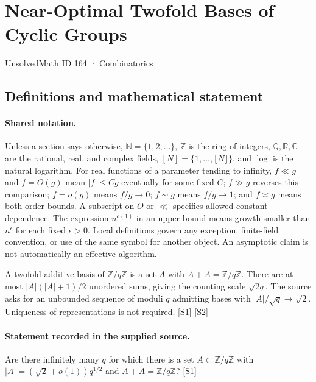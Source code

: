 \documentclass[11pt,a4paper]{article}
\newcommand{\N}{\mathbb{N}}
\newcommand{\Z}{\mathbb{Z}}
\newcommand{\Q}{\mathbb{Q}}
\newcommand{\R}{\mathbb{R}}
\newcommand{\C}{\mathbb{C}}
\newcommand{\sref}[2]{\hyperlink{source:#1:#2}{[S#2]}}
\begin{document}

\setcounter{section}{163}

\section{Near-Optimal Twofold Bases of Cyclic Groups}\label{164}

{\small\sffamily UnsolvedMath ID 164 · Combinatorics}

\subsection{Definitions and mathematical statement}

\paragraph{Shared notation.}Unless a section says otherwise, $\N=\{1,2,\ldots\}$,
$\Z$ is the ring of integers, $\Q,\R,\C$ are the rational, real, and complex
fields, $[N]=\{1,\ldots,\lfloor N\rfloor\}$, and $\log$ is the natural
logarithm. For real functions of a parameter tending to infinity,
$f\ll g$ and $f=O(g)$ mean $|f|\leq Cg$ eventually for some fixed $C$;
$f\gg g$ reverses this comparison; $f=o(g)$ means $f/g\to0$;
$f\sim g$ means $f/g\to1$; and $f\asymp g$ means both order bounds.
A subscript on $O$ or $\ll$ specifies allowed constant dependence.
The expression $n^{o(1)}$ in an upper bound means growth smaller than
$n^\epsilon$ for each fixed $\epsilon>0$. Local definitions govern any
exception, finite-field convention, or use of the same symbol for another
object. An asymptotic claim is not automatically an effective algorithm.



A twofold additive basis of $\Z/q\Z$ is a set $A$ with $A+A=\Z/q\Z$. There are at most $|A|(|A|+1)/2$ unordered sums, giving the counting scale $\sqrt{2q}$. The source asks for an unbounded sequence of moduli $q$ admitting bases with $|A|/\sqrt q\to\sqrt2$. Uniqueness of representations is not required. \sref{164}{1} \sref{164}{2}

\paragraph{Statement recorded in the supplied source.}
Are there infinitely many $q$ for which there is a set $A \subset \mathbb{Z}/q\mathbb{Z}$ with $|A| = (\sqrt{2} + o(1))q^{1/2}$ and $A + A = \mathbb{Z}/q\mathbb{Z}$? \sref{164}{1}
\end{document}
